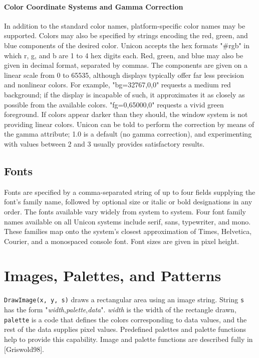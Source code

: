 \paragraph{Color Coordinate Systems and Gamma Correction}
In addition to the standard color names, platform-specific color names
may be supported. Colors may also be specified by strings encoding the
red, green, and blue components of the desired color. Unicon accepts
the hex formats "\#rgb" in which r, g, and b are 1 to 4 hex digits
each. Red, green, and blue may also be given in decimal format,
separated by commas. The components are given on a linear scale from 0
to 65535, although displays typically offer far less precision and
nonlinear colors. For example, "bg=32767,0,0" requests a medium red
background; if the display is incapable of such, it approximates it as
closely as possible from the available colors.  "fg=0,65000,0"
requests a vivid green foreground. If colors appear darker than they
should, the window system is not providing linear colors. Unicon can
be told to perform the correction by means of the gamma attribute; 1.0
is a default (no gamma correction), and experimenting with values
between 2 and 3 usually provides satisfactory results.

\subsection*{Fonts}

Fonts are specified by a comma-separated string of up to four fields
supplying the font's family name, followed by optional size or italic
or bold designations in any order. The fonts available vary widely
from system to system. Four font family names available on all Unicon
systems include serif, sans, typewriter, and mono. These families map
onto the system's closest approximation of Times, Helvetica, Courier,
and a monospaced console font. Font sizes are given in pixel height.

\section{Images, Palettes, and Patterns}

\texttt{DrawImage(x, y, s)} draws a rectangular area using an image
string.  String \texttt{s} has the form
"\textit{width},\textit{palette},\textit{data}".  \textit{width} is
the width of the rectangle drawn, \texttt{palette} is a code that
defines the colors corresponding to data values, and the rest of the
data supplies pixel values. Predefined palettes and palette functions
help to provide this capability. Image and palette functions are
described fully in [Griswold98].

